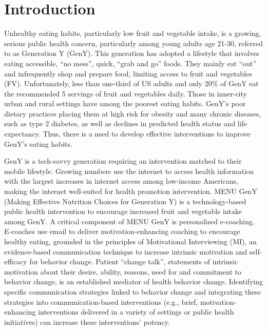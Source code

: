 \documentclass{amia}
\begin{document}
\section*{Introduction}
Unhealthy eating habits, particularly low fruit and vegetable intake, is a growing, serious public health concern, particularly among young adults age 21-30, referred to as Generation Y (GenY)\cite{blanck2008trends,centers2007fruit}. This generation has adopted a lifestyle that involves eating accessible, ``no mess'', quick, ``grab and go'' foods\cite{nebeling2007still,brug1999application}. They mainly eat ``out'' and infrequently shop and prepare food, limiting access to fruit and vegetables (FV)\cite{nelson2009improving,larson2006food}. Unfortunately, less than one-third of US adults\cite{blanck2008trends,ogden2006prevalence} and only 20\% of GenY\cite{blanck2008trends,american2006american,thompson2005dietary} eat the recommended 5 servings of fruit and vegetables daily. Those in inner-city urban and rural settings have among the poorest eating habits\cite{blanck2008trends,centers2007fruit,ogden2006prevalence,american2006american,thompson2005dietary}. GenY's poor dietary practices placing them at high risk for obesity and many chronic diseases, such as type 2 diabetes, as well as declines in predicted health status and life expectancy. Thus, there is a need to develop effective interventions to improve GenY's eating habits.

GenY is a tech-savvy generation requiring an intervention matched to their mobile lifestyle. Growing numbers use the internet to access health information with the largest increases in internet access among low-income Americans, making the internet well-suited for health promotion intervention\cite{strecher2007internet}. MENU GenY\cite{alexander2017motivations} (Making Effective Nutrition Choices for Generation Y) is a technology-based public health intervention to encourage increased fruit and vegetable intake among GenY. A critical component of MENU GenY is personalized e-coaching. E-coaches use email to deliver motivation-enhancing coaching to encourage healthy eating, grounded in the principles of Motivational Interviewing (MI), an evidence-based communication technique to increase intrinsic motivation and self-efficacy for behavior change\cite{miller2012motivational,miller2009ten,miller2009toward}. Patient ``change talk'', statements of intrinsic motivation about their desire, ability, reasons, need for and commitment to behavior change, is an established mediator of health behavior change\cite{apodaca2009mechanisms}. Identifying specific communication strategies linked to behavior change and integrating these strategies into communication-based interventions (e.g., brief, motivation-enhancing interventions delivered in a variety of settings or public health initiatives) can increase these interventions' potency.
\end{document}
